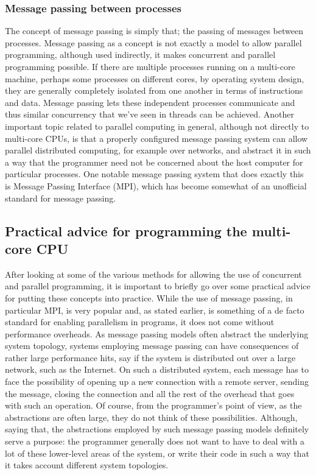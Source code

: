 \documentclass[a4paper,11pt]{article}
\begin{document}
\subsubsection{Message passing between processes} %
\label{ssub:message_passing_between_processes}
The concept of message passing is simply that; the passing of messages between processes. Message passing as a concept is
not exactly a model to allow parallel programming, although used indirectly, it makes concurrent and parallel programming
possible. If there are multiple processes running on a multi-core machine, perhaps some processes on different cores, by
operating system design, they are generally completely isolated from one another in terms of instructions and data. Message
passing lets these independent processes communicate and thus similar concurrency that we've seen in threads can be achieved.
Another important topic related to parallel computing in general, although not directly to multi-core CPUs, is that a
properly configured message passing system can allow parallel distributed computing, for example over networks, and abstract
it in such a way that the programmer need not be concerned about the host computer for particular processes. One notable
message passing system that does exactly this is Message Passing Interface (MPI), which has become somewhat of an unofficial
standard for message passing.


\subsection{Practical advice for programming the multi-core CPU} %
\label{sub:practical_advice_for_programming_the_multi_core_cpu}
After looking at some of the various methods for allowing the use of concurrent and parallel programming, it is important
to briefly go over some practical advice for putting these concepts into practice. While the use of message passing, in
particular MPI, is very popular and, as stated earlier, is something of a de facto standard for enabling parallelism in
programs, it does not come without performance overheads. As message passing models often abstract the underlying system topology, systems
employing message passing can have consequences of rather large performance hits, say if the system is distributed out
over a large network, such as the Internet. On such a distributed system, each message has to face the possibility of
opening up a new connection with a remote server, sending the message, closing the connection and all the rest of the
overhead that goes with such an operation. Of course, from the programmer's point of view, as the abstractions are often
large, they do not think of these possibilities. Although, saying that, the abstractions employed by such message passing
models definitely serve a purpose: the programmer generally does not want to have to deal with a lot of these lower-level
areas of the system, or write their code in such a way that it takes account different system topologies.
\end{document}
